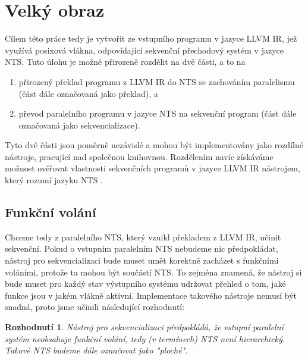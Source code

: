 \documentclass[10pt,a4paper,notitlepage]{report}
\newtheorem{decision}{Rozhodnutí}
\begin{document}
\section{Velký obraz}
Cílem této práce tedy je vytvořit ze vstupního programu v jazyce LLVM IR, jež využívá posixová vlákna, odpovídající sekvenční přechodový systém v jazyce NTS. Tuto úlohu je možné přirozeně rozdělit na dvě části, a to na
\begin{enumerate}
\item přirozený překlad programu z LLVM IR do NTS se zachováním paralelismu (část dále označovaná jako překlad), a
\item převod paralelního programu v jazyce NTS na sekvenční program (část dále označovaná jako sekvencializace).
\end{enumerate}

Tyto dvě části jsou poměrně nezávislé a mohou být implementovány jako rozdílné nástroje, pracující nad společnou knihovnou. Rozdělením navíc získáváme možnost ověřovat vlastnosti sekvenčních programů v jazyce LLVM IR nástrojem, který rozumí jazyku NTS .




\subsection{Funkční volání} %

Chceme tedy z paralelního NTS, který vznikl překladem z LLVM IR, učinit sekvenční. Pokud o vstupním paralelním NTS nebudeme nic předpokládat, nástroj pro sekvencializaci bude muset umět korektně zacházet s funkčními voláními, protože ta mohou být součástí NTS. To zejména znamená, že nástroj si bude muset pro každý stav výstupního systému udržovat přehled o tom, jaké funkce jsou v jakém vlákně aktivní. Implementace takového nástroje nemusí být snadná, proto jsme učinili následující rozhodnutí:

\begin{decision}
Nástroj pro sekvencializaci předpokládá, že vstupní paralelní systém neobsahuje funkční volání, tedy (v termínech) NTS není hierarchický. Takové NTS budeme dále označovat jako "ploché".
\end{decision}
\end{document}
